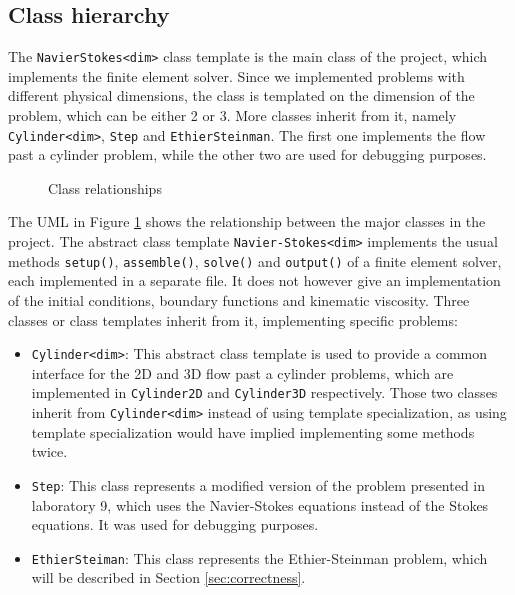 \subsection{Class hierarchy}
The \texttt{NavierStokes<dim>} class template is the main class of the project, which implements the finite element solver. Since we implemented problems with different physical dimensions, the class is templated on the dimension of the problem, which can be either 2 or 3. More classes inherit from it, namely \texttt{Cylinder<dim>}, \texttt{Step} and \texttt{EthierSteinman}. The first one implements the flow past a cylinder problem, while the other two are used for debugging purposes.

\begin{figure}[ht]
\centering

\caption{Class relationships}
\label{fig:uml}
\end{figure}

The UML in Figure \ref{fig:uml} shows the relationship between the major classes in the project. The abstract class template \texttt{Navier-Stokes<dim>} implements the usual methods \texttt{setup()}, \texttt{assemble()}, \texttt{solve()} and \texttt{output()} of a finite element solver, each implemented in a separate file. It does not however give an implementation of the initial conditions, boundary functions and kinematic viscosity. Three classes or class templates inherit from it, implementing specific problems:
\begin{itemize}
    \item \texttt{Cylinder<dim>}: This abstract class template is used to provide a common interface for the 2D and 3D flow past a cylinder problems, which are implemented in \texttt{Cylinder2D} and \texttt{Cylinder3D} respectively. Those two classes inherit from \texttt{Cylinder<dim>} instead of using template specialization, as using template specialization would have implied implementing some methods twice.
    \item \texttt{Step}: This class represents a modified version of the problem presented in laboratory 9, which uses the Navier-Stokes equations instead of the Stokes equations. It was used for debugging purposes.
    \item \texttt{EthierSteiman}: This class represents the Ethier-Steinman problem, which will be described in Section \ref{sec:correctness}.
\end{itemize}

